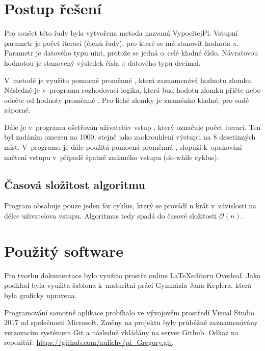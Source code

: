 \documentclass[11pt,a4paper,twoside,openright]{report}
\begin{document}
	\section{Postup řešení}
	Pro součet této řady byla vytvořena metoda nazvaná VypocitejPi. Vstupní parametr je počet iterací (členů řady), pro které se má stanovit hodnota $\pi$. Parametr je datového typu uint, protože se jedná o~celé kladné číslo. Návratovou hodnotou je stanovený výsledek čísla $\pi$ datového typu decimal.
	
	V~metodě je využito pomocné proměnné , která zaznamenává hodnotu zlomku. Následně je v~programu rozhodovací logika, která buď hodotu zlomku přičte nebo odečte od hodnoty proměnné . Pro liché zlomky je znaménko kladné, pro sudé záporné. 
	
	Dále je v~programu ošetřován uživatelův vstup , který označuje počet iterací. Ten byl zadáním omezen na 1000, stejně jako zaokrouhlení výstupu na 8 desetinných míst. V~programu je dále použitá pomocná proměnná , slopuží k~opakování načtení vstupu v~případě špatně zadaného vstupu (do-while cyklus).
	
	\subsection{Časová složitost algoritmu}
	Program obsahuje pouze jeden for cyklus, který se provádí n krát v~závislosti na délce uživatelova vstupu. Algoritmus tedy spadá do časové složitosti $\mathcal{O}(n)$.
	
	\section{Použitý software}
	Pro tvorbu dokumentace bylo využito prostře online \LaTeX editoru Overleaf. Jako podklad byla využita šablona k~maturitní práci Gymnázia Jana Keplera, která byla graficky upravena.
	
	Programování samotné aplikace probíhalo ve vývojovém prostředí Visual Studio 2017 od společnosti Microsoft. Změny na projektu byly průběžně zaznamenávány verzovacím systémem Git a následně vkládány na server Github. Odkaz na repozitář: \url{https://github.com/aulichv/pi_Gregory.git}.
	
\end{document}
